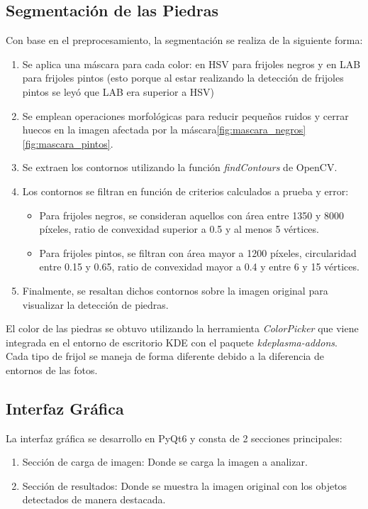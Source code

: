 \documentclass[conference]{IEEEtran}
\begin{document}
    \subsection{Segmentación de las Piedras}
    Con base en el preprocesamiento, la segmentación se realiza de la siguiente forma:
    \begin{enumerate}
        \item Se aplica una máscara para cada color: en HSV para frijoles negros y en LAB para frijoles pintos (esto porque al estar realizando la detección de frijoles pintos se leyó\cite{lab} que LAB era superior a HSV)
        \item Se emplean operaciones morfológicas para reducir pequeños ruidos y cerrar huecos en la imagen afectada por la máscara\ref{fig:mascara_negros}\ref{fig:mascara_pintos}.
        \item Se extraen los contornos utilizando la función \textit{findContours} de OpenCV.
        \item Los contornos se filtran en función de criterios calculados a prueba y error:
        \begin{itemize}
            \item Para frijoles negros, se consideran aquellos con área entre 1350 y 8000 píxeles, ratio de convexidad superior a 0.5 y al menos 5 vértices.
            \item Para frijoles pintos, se filtran con área mayor a 1200 píxeles, circularidad entre 0.15 y 0.65, ratio de convexidad mayor a 0.4 y entre 6 y 15 vértices.
        \end{itemize}
        \item Finalmente, se resaltan dichos contornos sobre la imagen original para visualizar la detección de piedras.
    \end{enumerate}

    El color de las piedras se obtuvo utilizando la herramienta \textit{ColorPicker}\cite{colorpicker} que viene integrada en el entorno de escritorio KDE con el paquete \textit{kdeplasma-addons}. Cada tipo de frijol se maneja de forma diferente debido a la diferencia de entornos de las fotos.

    \subsection{Interfaz Gráfica}
    La interfaz gráfica se desarrollo en PyQt6\cite{pyqt6} y consta de 2 secciones principales:
    \begin{enumerate}
        \item Sección de carga de imagen: Donde se carga la imagen a analizar.
        \item Sección de resultados: Donde se muestra la imagen original con los objetos detectados de manera destacada.
    \end{enumerate}
\end{document}
